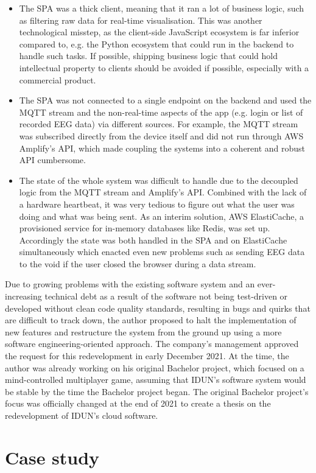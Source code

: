 \begin{itemize}
\item The SPA was a thick client, meaning that it ran a lot of business logic, such as filtering raw data for real-time visualisation. This was another technological misstep, as the client-side JavaScript ecosystem is far inferior compared to, e.g. the Python ecosystem that could run in the backend to handle such tasks. If possible, shipping business logic that could hold intellectual property to clients should be avoided if possible, especially with a commercial product.
\item The SPA was not connected to a single endpoint on the backend and used the MQTT stream and the non-real-time aspects of the app (e.g. login or list of recorded EEG data) via different sources. For example, the MQTT stream was subscribed directly from the device itself and did not run through AWS Amplify's API, which made coupling the systems into a coherent and robust API cumbersome.
\item The state of the whole system was difficult to handle due to the decoupled logic from the MQTT stream and Amplify's API. Combined with the lack of a hardware heartbeat, it was very tedious to figure out what the user was doing and what was being sent. As an interim solution, AWS ElastiCache, a provisioned service for in-memory databases like Redis, was set up. Accordingly the state was both handled in the SPA and on ElastiCache simultaneously which enacted even new problems such as sending EEG data to the void if the user closed the browser during a data stream.
\end{itemize}

Due to growing problems with the existing software system and an ever-increasing technical debt as a result of the software not being test-driven or developed without clean code quality standards, resulting in bugs and quirks that are difficult to track down, the author proposed to halt the implementation of new features and restructure the system from the ground up using a more software engineering-oriented approach. The company's management approved the request for this redevelopment in early December 2021. At the time, the author was already working on his original Bachelor project, which focused on a mind-controlled multiplayer game, assuming that IDUN's software system would be stable by the time the Bachelor project began. The original Bachelor project's focus was officially changed at the end of 2021 to create a thesis on the redevelopment of IDUN's cloud software.

\section{Case study}
\label{chapter3-case-study}

